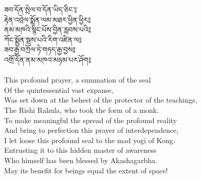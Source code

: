 ཟབ་དོན་སྤེལ་བ་དོན་ཡིད་ཅིང༌༔\\
རྟེན་འབྲེལ་སྨོན་ལམ་མཐར་ཕྱིན་ཕྱིར༔\\
ནམ་མཁའི་སྙིང་པོས་བྱིན་རླབས་པའི༔\\
ཀོང་སྨྱོན་སྦས་པའི་རིག་འཛིན་ལ༔\\
ཟབ་རྒྱ་བཀྲོལ་ཏེ་གཏད་རྒྱ་བྱས༔\\
འགྲོ་དོན་ནམ་མཁའ་མཉམ་པར་ཤོག༔\\
\\
\ru This profound prayer, a summation of the seal\\
Of the quintessential vast expanse,\\
Was set down at the behest of the protector of the teachings,\\
The Rishi Rahula, who took the form of a monk.\\
To make meaningful the spread of the profound reality\\
And bring to perfection this prayer of interdependence,\\
I let loose this profound seal to the mad yogi of Kong.\\
Entrusting it to this hidden master of awareness\\
Who himself has been blessed by Akashagarbha.\\
May its benefit for beings equal the extent of space!\\
\\

